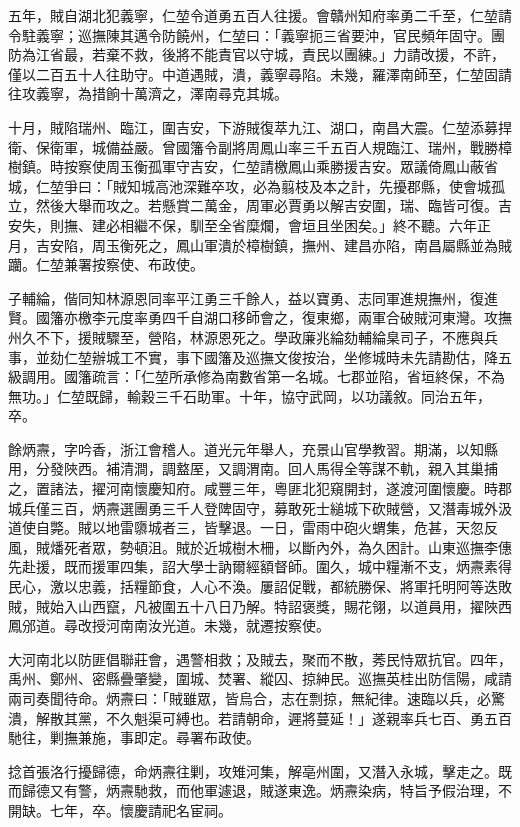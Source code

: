 \begin{pinyinscope}
五年，賊自湖北犯義寧，仁堃令道勇五百人往援。會贛州知府率勇二千至，仁堃請令駐義寧；巡撫陳其邁令防饒州，仁堃曰：「義寧扼三省要沖，官民頻年固守。團防為江省最，若棄不救，後將不能責官以守城，責民以團練。」力請改援，不許，僅以二百五十人往助守。中道遇賊，潰，義寧尋陷。未幾，羅澤南師至，仁堃固請往攻義寧，為措餉十萬濟之，澤南尋克其城。

十月，賊陷瑞州、臨江，圍吉安，下游賊復萃九江、湖口，南昌大震。仁堃添募捍衛、保衛軍，城備益嚴。曾國籓令副將周鳳山率三千五百人規臨江、瑞州，戰勝樟樹鎮。時按察使周玉衡孤軍守吉安，仁堃請檄鳳山乘勝援吉安。眾議倚鳳山蔽省城，仁堃爭曰：「賊知城高池深難卒攻，必為翦枝及本之計，先擾郡縣，使會城孤立，然後大舉而攻之。若懸賞二萬金，周軍必賈勇以解吉安圍，瑞、臨皆可復。吉安失，則撫、建必相繼不保，馴至全省糜爛，會垣且坐困矣。」終不聽。六年正月，吉安陷，周玉衡死之，鳳山軍潰於樟樹鎮，撫州、建昌亦陷，南昌屬縣並為賊躪。仁堃兼署按察使、布政使。

子輔綸，偕同知林源恩同率平江勇三千餘人，益以寶勇、志同軍進規撫州，復進賢。國籓亦檄李元度率勇四千自湖口移師會之，復東鄉，兩軍合破賊河東灣。攻撫州久不下，援賊驟至，營陷，林源恩死之。學政廉兆綸劾輔綸臬司子，不應與兵事，並劾仁堃辦城工不實，事下國籓及巡撫文俊按治，坐修城時未先請勘估，降五級調用。國籓疏言：「仁堃所承修為南數省第一名城。七郡並陷，省垣終保，不為無功。」仁堃既歸，輸穀三千石助軍。十年，協守武岡，以功議敘。同治五年，卒。

餘炳燾，字吟香，浙江會稽人。道光元年舉人，充景山官學教習。期滿，以知縣用，分發陜西。補清澗，調盩厔，又調渭南。回人馬得全等謀不軌，親入其巢捕之，置諸法，擢河南懷慶知府。咸豐三年，粵匪北犯窺開封，遂渡河圍懷慶。時郡城兵僅三百，炳燾選團勇三千人登陴固守，募敢死士縋城下砍賊營，又潛毒城外汲道使自斃。賊以地雷隳城者三，皆擊退。一日，雷雨中砲火蝟集，危甚，天忽反風，賊燔死者眾，勢頓沮。賊於近城樹木柵，以斷內外，為久困計。山東巡撫李僡先赴援，既而援軍四集，詔大學士訥爾經額督師。圍久，城中糧漸不支，炳燾素得民心，激以忠義，括糧節食，人心不渙。屢詔促戰，都統勝保、將軍托明阿等迭敗賊，賊始入山西竄，凡被圍五十八日乃解。特詔褒獎，賜花翎，以道員用，擢陜西鳳邠道。尋改授河南南汝光道。未幾，就遷按察使。

大河南北以防匪倡聯莊會，遇警相救；及賊去，聚而不散，莠民恃眾抗官。四年，禹州、鄭州、密縣疊肇變，圍城、焚署、縱囚、掠紳民。巡撫英桂出防信陽，咸請兩司奏聞待命。炳燾曰：「賊雖眾，皆烏合，志在剽掠，無紀律。速臨以兵，必驚潰，解散其黨，不久魁渠可縛也。若請朝命，遲將蔓延！」遂親率兵七百、勇五百馳往，剿撫兼施，事即定。尋署布政使。

捻首張洛行擾歸德，命炳燾往剿，攻雉河集，解亳州圍，又潛入永城，擊走之。既而歸德又有警，炳燾馳救，而他軍遽退，賊遂東逸。炳燾染病，特旨予假治理，不開缺。七年，卒。懷慶請祀名宦祠。


\end{pinyinscope}
